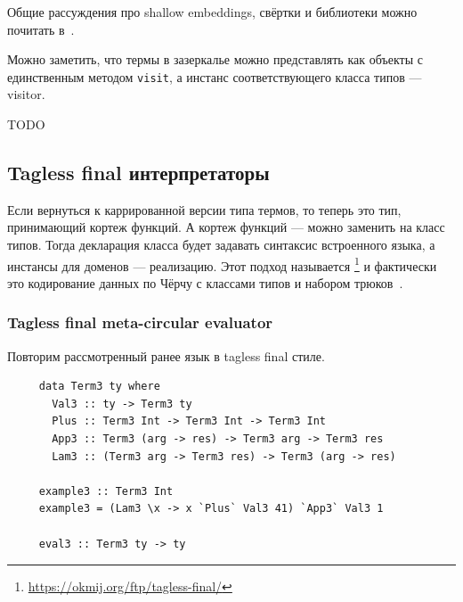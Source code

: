 Общие рассуждения про shallow embeddings, свёртки и библиотеки можно почитать в~\cite{gibbons2013functional, gibbons2014folding}.

Можно заметить, что термы в зазеркалье можно представлять как объекты с единственным методом \texttt{visit}, а инстанс соответствующего класса типов --- visitor.


TODO %



\subsection{Tagless final интерпретаторы}

Если вернуться к каррированной версии типа термов, то теперь это тип, принимающий кортеж функций.
А кортеж функций --- можно заменить на класс типов.
Тогда декларация класса будет задавать синтаксис встроенного языка, а инстансы для доменов --- реализацию.
Этот подход называется \footnote{\url{https://okmij.org/ftp/tagless-final/}} и фактически это кодирование данных по Чёрчу с классами типов и набором трюков~\cite{carette2007finally, kiselyov2012typed}.

\subsubsection{Tagless final meta-circular evaluator}

Повторим рассмотренный ранее язык в tagless final стиле.

\begin{verbatim}
     data Term3 ty where
       Val3 :: ty -> Term3 ty
       Plus :: Term3 Int -> Term3 Int -> Term3 Int
       App3 :: Term3 (arg -> res) -> Term3 arg -> Term3 res
       Lam3 :: (Term3 arg -> Term3 res) -> Term3 (arg -> res)

     example3 :: Term3 Int
     example3 = (Lam3 \x -> x `Plus` Val3 41) `App3` Val3 1

     eval3 :: Term3 ty -> ty
\end{verbatim}


